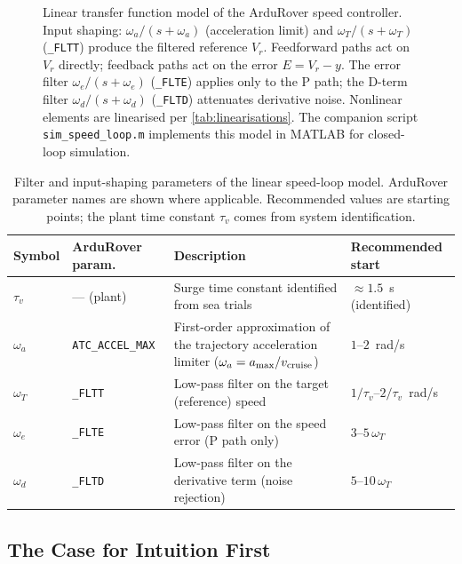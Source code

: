 \documentclass[12pt]{article}
\begin{document}
\begin{figure}[htbp]
{\begin{tikzpicture}[
  >=Latex, thick,
  block/.style = {draw, rectangle, minimum height=2.5em, minimum width=4.5em, align=center},
  sum/.style   = {draw, circle, inner sep=0pt, minimum size=1.2em},
]
\end{tikzpicture}%
}
\caption{Linear transfer function model of the ArduRover speed controller.
  Input shaping: $\omega_a/(s{+}\omega_a)$ (acceleration limit) and
  $\omega_T/(s{+}\omega_T)$ (\texttt{\_FLTT}) produce the filtered reference
  $V_r$.  Feedforward paths act on $V_r$ directly; feedback paths act on
  the error $E = V_r - y$.  The error filter $\omega_e/(s{+}\omega_e)$
  (\texttt{\_FLTE}) applies only to the P path; the D-term filter
  $\omega_d/(s{+}\omega_d)$ (\texttt{\_FLTD}) attenuates derivative noise.
  Nonlinear elements are linearised per \cref{tab:linearisations}.
  The companion script \texttt{sim\_speed\_loop.m} implements this model
  in MATLAB for closed-loop simulation.}
\label{fig:speed_loop_linear}
\end{figure}

\begin{table}[htbp]
\centering
\caption{Filter and input-shaping parameters of the linear speed-loop model.
  ArduRover parameter names are shown where applicable.
  Recommended values are starting points; the plant time constant $\tau_v$
  comes from system identification.}
\label{tab:filter_params}
\begin{tabular}{llp{4.8cm}l}
\toprule
Symbol & ArduRover param. & Description & Recommended start \\
\midrule
$\tau_v$ & --- (plant) &
  Surge time constant identified from sea trials &
  $\approx 1.5$~s (identified) \\
$\omega_a$ & \texttt{ATC\_ACCEL\_MAX} &
  First-order approximation of the trajectory acceleration limiter
  ($\omega_a = a_{\max}/v_{\rm cruise}$) &
  $1$--$2$~rad/s \\
$\omega_T$ & \texttt{\_FLTT} &
  Low-pass filter on the target (reference) speed &
  $1/\tau_v$--$2/\tau_v$~rad/s \\
$\omega_e$ & \texttt{\_FLTE} &
  Low-pass filter on the speed error (P path only) &
  $3$--$5\,\omega_T$ \\
$\omega_d$ & \texttt{\_FLTD} &
  Low-pass filter on the derivative term (noise rejection) &
  $5$--$10\,\omega_T$ \\
\bottomrule
\end{tabular}
\end{table}

\subsection{The Case for Intuition First}
\end{document}
